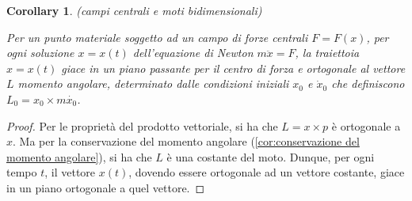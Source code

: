 \documentclass{article}
\newtheorem{corollary}{Corollary}[theorem]
\begin{document}
            \begin{corollary}(campi centrali e moti bidimensionali)
                \label{cor:campi centrale e moti bidimensionali}

                Per un punto materiale soggetto ad un campo di forze centrali $F = F(x)$, per ogni soluzione $x = x(t)$ dell'equazione di Newton $m \ddot{x} = F$, 
                la traiettoia $x = x(t)$ giace in un piano passante per il centro di forza e ortogonale al vettore $L$ momento angolare, determinato dalle 
                condizioni iniziali $x_0$ e $\dot{x}_0$ che definiscono $L_0 = x_0 \times m \dot{x_0}$.

            \end{corollary}
            \begin{proof}
                
                Per le proprietà del prodotto vettoriale, si ha che $L = x \times p$ è ortogonale a $x$. Ma per la conservazione del momento angolare (\ref{cor:conservazione del momento angolare}),
                si ha che $L$ è una costante del moto. Dunque, per ogni tempo $t$, il vettore $x(t)$, dovendo essere ortogonale ad un vettore costante, giace in un piano ortogonale a quel vettore.

            \end{proof}
\end{document}
